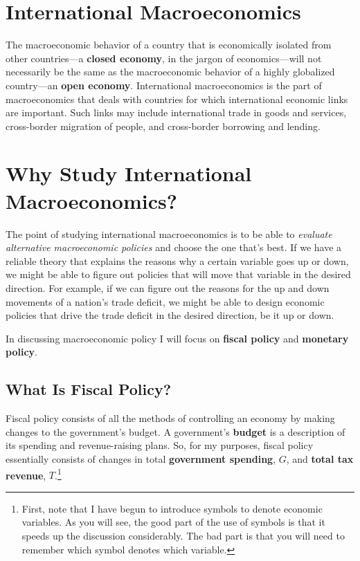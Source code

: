\documentclass[
  letterpaper,
]{book}
\begin{document}
\section{International Macroeconomics}\label{sec-intmac}

The macroeconomic behavior of a country that is economically isolated
from other countries---a \textbf{closed economy}, in the jargon of
economics---will not necessarily be the same as the macroeconomic
behavior of a highly globalized country---an \textbf{open economy}.
International macroeconomics is the part of macroeconomics that deals
with countries for which international economic links are important.
Such links may include international trade in goods and services,
cross-border migration of people, and cross-border borrowing and
lending.

\section{Why Study International Macroeconomics?}\label{sec-whyintmac}

The point of studying international macroeconomics is to be able to
\emph{evaluate alternative macroeconomic policies} and choose the one
that's best. If we have a reliable theory that explains the reasons why
a certain variable goes up or down, we might be able to figure out
policies that will move that variable in the desired direction. For
example, if we can figure out the reasons for the up and down movements
of a nation's trade deficit, we might be able to design economic
policies that drive the trade deficit in the desired direction, be it up
or down.

In discussing macroeconomic policy I will focus on
\textbf{fiscal policy} and \textbf{monetary policy}.

\subsection{What Is Fiscal Policy?}\label{sec-fiscal}

Fiscal policy consists of all the methods of
controlling an economy by making changes to the government's budget. A
government's \textbf{budget} is a
description of its spending and revenue-raising plans. So, for my
purposes, fiscal policy essentially consists of changes in total
\textbf{government spending}, \(G\), and
\textbf{total tax revenue}, \(T\).\footnote{First,
  note that I have begun to introduce symbols to denote economic
  variables. As you will see, the good part of the use of symbols is
  that it speeds up the discussion considerably. The bad part is that
  you will need to remember which symbol denotes which variable.}
\end{document}

